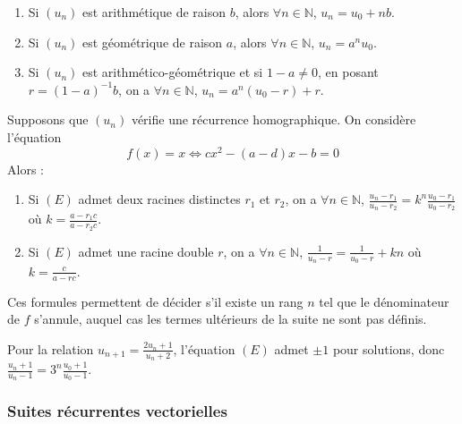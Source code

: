 	\begin{proposition}
		\begin{enumerate}[label=(\roman*)]
			\item Si $(u_n)$ est arithmétique de raison $b$, alors $\forall n \in \mathbb{N}$, $u_n = u_0 + n b$.
			\item Si $(u_n)$ est géométrique de raison $a$, alors $\forall n \in \mathbb{N}$, $u_n = a^n u_0$.
			\item Si $(u_n)$ est arithmético-géométrique et si $1 - a \neq 0$, en posant $r = (1 - a)^{-1} b$, on a $\forall n \in \mathbb{N}$, $u_n = a^n (u_0 - r) + r$.
		\end{enumerate}
	\end{proposition}
	
	\begin{proposition}
		Supposons que $(u_n)$ vérifie une récurrence homographique. On considère l'équation
		\[ f(x) = x \iff cx^2 - (a-d)x - b = 0 \tag{$E$} \]
		Alors :
		\begin{enumerate}
			\item Si $(E)$ admet deux racines distinctes $r_1$ et $r_2$, on a
			$\forall n \in \mathbb{N}$, $\frac{u_n - r_1}{u_n - r_2} = k^n \frac{u_0 - r_1}{u_0 - r_2}$ où $k = \frac{a - r_1 c}{a - r_2 c}$.
			\item Si $(E)$ admet une racine double $r$, on a $\forall n \in \mathbb{N}$, $\frac{1}{u_n - r} = \frac{1}{u_0 - r} + kn$ où $k = \frac{c}{a - r c}$.
		\end{enumerate}
	\end{proposition}
	
	\begin{remark}
		Ces formules permettent de décider s'il existe un rang $n$ tel que le dénominateur de $f$ s'annule, auquel cas les termes ultérieurs de la suite ne sont pas définis.
	\end{remark}
	
	\begin{example}
		Pour la relation $u_{n+1} = \frac{2u_n + 1}{u_n + 2}$, l'équation $(E)$ admet $\pm 1$ pour solutions, donc $\frac{u_n + 1}{u_n - 1} = 3^n \frac{u_0 + 1}{u_0 - 1}$.
	\end{example}
	
	\subsubsection{Suites récurrentes vectorielles}
	
	
